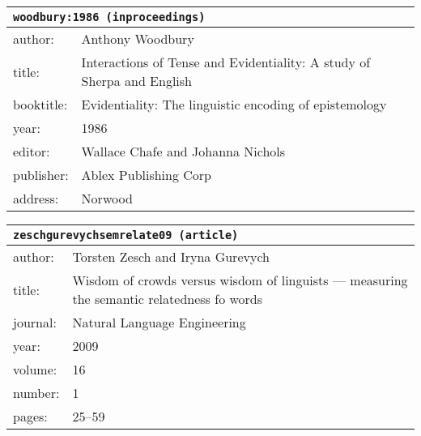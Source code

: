 \documentclass{article}
\begin{document}
\bigskip

\begin{tabular}{p{}p{}}
\multicolumn{2}{l}{\texttt{woodbury:1986 (inproceedings)}}\\
\hline
author: & Anthony Woodbury\\
title: & Interactions of Tense and Evidentiality: A study of Sherpa and English\\
booktitle: & Evidentiality: The linguistic encoding of epistemology\\
year: & 1986\\
editor: & Wallace Chafe and Johanna Nichols\\
publisher: & Ablex Publishing Corp\\
address: & Norwood\\
\end{tabular}

\bigskip

\begin{tabular}{p{}p{}}
\multicolumn{2}{l}{\texttt{zeschgurevychsemrelate09 (article)}}\\
\hline
author: & Torsten Zesch and Iryna Gurevych\\
title: & Wisdom of crowds versus wisdom of linguists --- measuring the semantic relatedness fo words\\
journal: & Natural Language Engineering\\
year: & 2009\\
volume: & 16\\
number: & 1\\
pages: & 25--59\\
\end{tabular}

\bigskip
\end{document}
